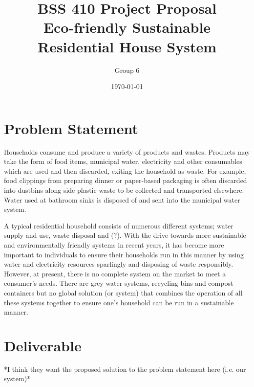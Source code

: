 \documentclass{article}
\begin{document}
\title{\vspace{-5em} BSS 410 Project Proposal\\Eco-friendly Sustainable Residential House System}
\author{Group 6}
\date{\today}
\maketitle

\section{Problem Statement}
  Households consume and produce a variety of products and wastes. Products may take the form of food items, municipal water, electricity and other consumables which are used and then discarded, exiting the household as waste. For example, food clippings from preparing dinner or paper-based packaging is often discarded into dustbins along side plastic waste to be collected and transported elsewhere. Water used at bathroom sinks is disposed of and sent into the municipal water system. 

  A typical residential household consists of numerous different systems; water supply and use, waste disposal and (?). With the drive towards more sustainable and environmentally friendly systems in recent years, it has become more important to individuals to ensure their households run in this manner by using water and electricity resources sparlingly and disposing of waste responsibly. However, at present, there is no complete system on the market to meet a consumer's needs. There are grey water systems, recycling bins and compost containers but no global solution (or system) that combines the operation of all these systems together to ensure one's household can be run in a sustainable manner.

\section{Deliverable}
*I think they want the proposed solution to the problem statement here (i.e. our system)*
\end{document}
